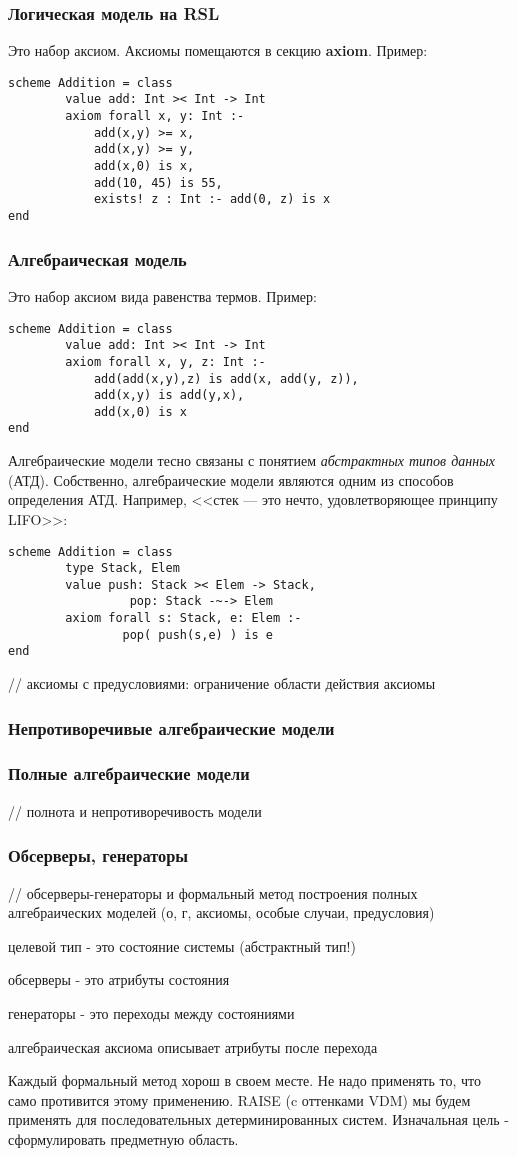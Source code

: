 \documentclass[14pt]{extreport}
\newcommand{\head}[1]{\vspace{1cm}\subsubsection{#1}}
\begin{document}
\head{Логическая модель на RSL}
Это набор аксиом. Аксиомы помещаются в секцию \textbf{axiom}. Пример:
\begin{lstlisting}
scheme Addition = class
        value add: Int >< Int -> Int
        axiom forall x, y: Int :-
            add(x,y) >= x,
            add(x,y) >= y,
            add(x,0) is x,
            add(10, 45) is 55,
            exists! z : Int :- add(0, z) is x
end
\end{lstlisting}

\head{Алгебраическая модель}
Это набор аксиом вида равенства термов. Пример:
\begin{lstlisting}
scheme Addition = class
        value add: Int >< Int -> Int
        axiom forall x, y, z: Int :-
            add(add(x,y),z) is add(x, add(y, z)),
            add(x,y) is add(y,x),
            add(x,0) is x
end
\end{lstlisting}

Алгебраические модели тесно связаны с понятием \emph{абстрактных типов данных} (АТД). Собственно, алгебраические модели являются одним из способов определения АТД. Например, <<стек --- это нечто, удовлетворяющее принципу LIFO>>:
\begin{lstlisting}
scheme Addition = class
        type Stack, Elem
        value push: Stack >< Elem -> Stack,
                 pop: Stack -~-> Elem
        axiom forall s: Stack, e: Elem :-
                pop( push(s,e) ) is e
end
\end{lstlisting}

// аксиомы с предусловиями: ограничение области действия аксиомы

\head{Непротиворечивые алгебраические модели}

\head{Полные алгебраические модели}

// полнота и непротиворечивость модели

\head{Обсерверы, генераторы}

// обсерверы-генераторы и формальный метод построения полных алгебраических моделей (о, г, аксиомы, особые случаи, предусловия)

целевой тип - это состояние системы (абстрактный тип!)

обсерверы - это атрибуты состояния

генераторы - это переходы между состояниями

алгебраическая аксиома описывает атрибуты после перехода 

Каждый формальный метод хорош в своем месте. Не надо применять то, что само противится этому применению. RAISE (c оттенками VDM) мы будем применять для последовательных детерминированных систем. Изначальная цель - сформулировать предметную область.
\end{document}
